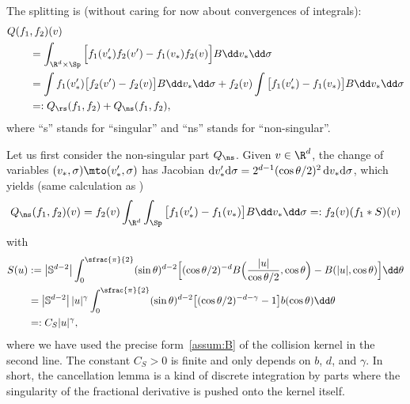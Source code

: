The splitting is (without caring for now about convergences of integrals):
\begin{equation}\label{e:split}
\begin{split}
Q (f_1&,f_2)(v) \\
& = \int_{\R^d \times \Sp} \Big[ f_1(v'_*) f_2(v')
- f_1(v_*) f_2(v) \Big] B \dd v_* \dd \sigma \\
& = \int f_1(v'_*) \big[ f_2(v')-f_2(v) \big] B \dd v_*
\dd \sigma + f_2(v) \int \big[ f_1(v'_*) - f_1(v_*)
\big] B \dd v_* \dd \sigma \\
& =: Q_{\rs}(f_1,f_2) + Q_{\ns}(f_1,f_2),
\end{split}
\end{equation}
where ``s'' stands for ``singular'' and ``ns'' stands for
``non-singular''.

Let us first consider the non-singular part $Q_{\ns}$. Given
$v \in \R^d$, the change of variables
$(v_*,\sigma) \mto (v'_*,\sigma)$ has Jacobian
${\rm d} v'_* {\rm d}\sigma = 2^{d-1} (\cos \theta/2)^2 \, {\rm d} v_*
{\rm d}\sigma$, which yields (same calculation as
\cite[Lem.\,1]{advw})
\begin{equation*}
Q_{\ns}(f_1,f_2)(v) = f_2(v) \int_{\R^d} \int_{\Sp} \big[ f_1(v'_*) - f_1(v_*)
\big] B \dd v_* \dd \sigma
=: f_2(v) (f_1 * S)(v)
\end{equation*}
with
\begin{align*}
S(u) & := \left|\mathbb S^{d-2}\right| \int_0^{\sfrac{\pi}{2}} (\sin
\theta)^{d-2} \Big[ (\cos \theta/2)^{-d}
B\Bigl( \frac{|u|}{\cos\theta/2}, \cos \theta \Bigr) - B(|u|,\cos \theta) \Big]
\dd \theta\\
& = \left|\mathbb S^{d-2}\right| |u|^\gamma
\int_0^{\sfrac{\pi}{2}} (\sin
\theta)^{d-2} \big[ (\cos \theta/2)^{-d-\gamma}
- 1 \big] b(\cos \theta)
\dd \theta \\
& =: C_S |u|^\gamma,
\end{align*}
where we have used the precise form~\eqref{assum:B} of the collision
kernel in the second line. The constant $C_S >0$ is finite and only
depends on $b$, $d$, and $\gamma$. In short, the cancellation lemma is
a kind of discrete integration by parts where the singularity of the
fractional derivative is pushed onto the kernel itself.


